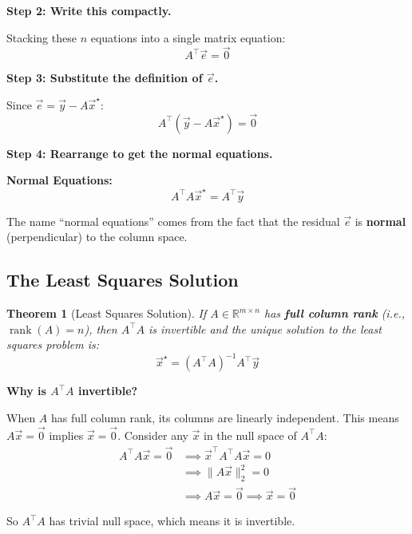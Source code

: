 \documentclass[10pt, twocolumn]{article}
\theoremstyle{definition}
\theoremstyle{plain}
\newtheorem{theorem}{Theorem}
\newcommand{\RR}{\mathbb{R}}
\DeclareMathOperator{\rank}{rank}
\begin{document}
\textbf{Step 2: Write this compactly.}

Stacking these $n$ equations into a single matrix equation:
\[
    A^\top \vec{e} = \vec{0}
\]

\textbf{Step 3: Substitute the definition of $\vec{e}$.}

Since $\vec{e} = \vec{y} - A\vec{x}^\star$:
\[
    A^\top (\vec{y} - A\vec{x}^\star) = \vec{0}
\]

\textbf{Step 4: Rearrange to get the normal equations.}

\begin{result}
\textbf{Normal Equations:}
\[
    A^\top A \vec{x}^\star = A^\top \vec{y}
\]
\end{result}

The name ``normal equations'' comes from the fact that the residual $\vec{e}$ is \textbf{normal} (perpendicular) to the column space.

\subsection{The Least Squares Solution}

\begin{tcolorbox}
\begin{theorem}[Least Squares Solution]
If $A \in \RR^{m \times n}$ has \textbf{full column rank} (i.e., $\rank(A) = n$), then $A^\top A$ is invertible and the unique solution to the least squares problem is:
\[
    \vec{x}^\star = (A^\top A)^{-1} A^\top \vec{y}
\]
\end{theorem}
\end{tcolorbox}

\textbf{Why is $A^\top A$ invertible?}

When $A$ has full column rank, its columns are linearly independent. This means $A\vec{x} = \vec{0}$ implies $\vec{x} = \vec{0}$. Consider any $\vec{x}$ in the null space of $A^\top A$:
\begin{align*}
    A^\top A \vec{x} = \vec{0} &\implies \vec{x}^\top A^\top A \vec{x} = 0 \\
    &\implies \|A\vec{x}\|_2^2 = 0 \\
    &\implies A\vec{x} = \vec{0} \implies \vec{x} = \vec{0}
\end{align*}

So $A^\top A$ has trivial null space, which means it is invertible.
\end{document}
